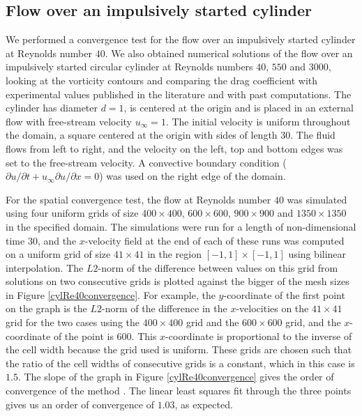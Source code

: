 \documentclass{tufte-handout}
\begin{document}
\subsection{Flow over an impulsively started cylinder}

We performed a convergence test for the flow over an impulsively started cylinder at Reynolds number $40$. We also obtained numerical solutions of the flow over an impulsively started circular cylinder at Reynolds numbers $40$, $550$ and $3000$, looking at the vorticity contours and comparing the drag coefficient with experimental values published in the literature\cite{Tritton1959} and with past computations.\cite{Koumoutsakos1995}  
The cylinder has diameter $d=1$, is centered at the origin and is placed in an external flow with free-stream velocity $u_{\infty}=1$. The initial velocity is uniform throughout the domain, a square centered at the origin with sides of length $30$. The fluid flows from left to right, and the velocity on the left, top and bottom edges was set to the free-stream velocity. A convective boundary condition (${\partial{u}}/{\partial{t}}+u_{\infty}{\partial{u}}/{\partial{x}}=0$) was used on the right edge of the domain.

For the spatial convergence test, the flow at Reynolds number $40$ was simulated using four uniform grids of size $400\times 400$, $600\times 600$, $900\times 900$ and $1350\times 1350$ in the specified domain. The simulations were run for a length of non-dimensional time $30$, and the $x$-velocity field at the end of each of these runs was computed on a uniform grid of size $41\times 41$ in the region $[-1,1]\times[-1,1]$ using bilinear interpolation. The $L2$-norm of the difference between values on this grid from solutions on two consecutive grids is plotted against the bigger of the mesh sizes in Figure \ref{cylRe40convergence}. For example, the $y$-coordinate of the first point on the graph is the $L2$-norm of the difference in the $x$-velocities on the $41\times 41$ grid for the two cases using the $400\times 400$ grid and the $600\times 600$ grid, and the $x$-coordinate of the point is 600. This $x$-coordinate is proportional to the inverse of the cell width because the grid used is uniform. These grids are chosen such that the ratio of the cell widths of consecutive grids is a constant, which in this case is $1.5$. The slope of the graph in Figure \ref{cylRe40convergence} gives the order of convergence of the method \cite{Roache1998}. The linear least squares fit through the three points gives us an order of convergence of $1.03$, as expected.
\end{document}
